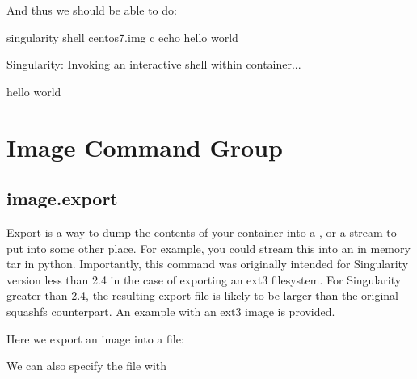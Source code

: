\documentclass[letterpaper,10pt,english]{sphinxmanual}
\begin{document}
And thus we should be able to do:

%
\begin{sphinxVerbatim}[commandchars=\\\{\}]
\PYGZdl{} singularity shell centos7.img \PYGZhy{}c \PYGZdq{}echo hello world\PYGZdq{}

Singularity: Invoking an interactive shell within container...


hello world
\end{sphinxVerbatim}


\section{Image Command Group}
\label{\detokenize{appendix:image-command-group}}

\subsection{image.export}
\label{\detokenize{appendix:id41}}\label{\detokenize{appendix:sec-imageexport}}
Export is a way to dump the contents of your container into a , or a
stream to put into some other place. For example, you could stream
this into an in memory tar in python. Importantly, this command was
originally intended for Singularity version less than 2.4 in the case
of exporting an ext3 filesystem. For Singularity greater than 2.4, the
resulting export file is likely to be larger than the original
squashfs counterpart. An example with an ext3 image is provided.

Here we export an image into a  file:

%
\begin{sphinxVerbatim}[commandchars=\\\{\}]
    
\end{sphinxVerbatim}

We can also specify the file with 

%
\begin{sphinxVerbatim}[commandchars=\\\{\}]
    
\end{sphinxVerbatim}
\end{document}
